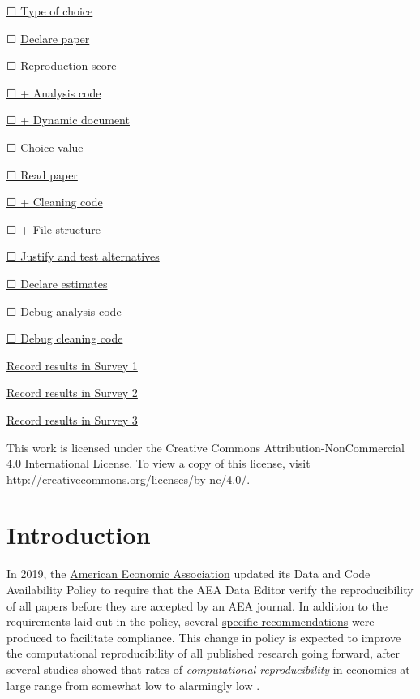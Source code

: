 \documentclass[]{book}
\begin{document}
\protect\hyperlink{id-type}{☐ Type of choice}

☐ \protect\hyperlink{declare}{Declare paper}

\protect\hyperlink{score}{☐ Reproduction score}

\protect\hyperlink{ac}{☐ + Analysis code}

\protect\hyperlink{paper-level}{☐ + Dynamic document}

\protect\hyperlink{id-val}{☐ Choice value}

\protect\hyperlink{read-summ}{☐ Read paper}

\protect\hyperlink{cc}{☐ + Cleaning code}

\protect\hyperlink{paper-level}{☐ + File structure}

\protect\hyperlink{test-rob}{☐ Justify and test alternatives}

\protect\hyperlink{declare-estimates}{☐ Declare estimates}

\protect\hyperlink{dac}{☐ Debug analysis code}

\protect\hyperlink{dcc}{☐ Debug cleaning code}

\href{https://berkeley.qualtrics.com/jfe/form/SV_2bO83uJvU9ZiTXv}{Record results in Survey 1}

\href{https://berkeley.qualtrics.com/jfe/form/SV_2gd9Y3XVtjLpZL7}{Record results in Survey 2}

\href{ADD\%20LINK}{Record results in Survey 3}

This work is licensed under the Creative Commons Attribution-NonCommercial 4.0 International License. To view a copy of this license, visit \url{http://creativecommons.org/licenses/by-nc/4.0/}.

\hypertarget{intro}{%
\chapter*{Introduction}\label{intro}}

In 2019, the \href{https://www.aeaweb.org/journals/policies/data-code/}{American Economic Association} updated its Data and Code Availability Policy to require that the AEA Data Editor verify the reproducibility of all papers before they are accepted by an AEA journal. In addition to the requirements laid out in the policy, several \href{https://aeadataeditor.github.io/aea-de-guidance/}{specific recommendations} were produced to facilitate compliance. This change in policy is expected to improve the computational reproducibility of all published research going forward, after several studies showed that rates of \emph{computational reproducibility} in economics at large range from somewhat low to alarmingly low \citep{galiani2018make, chang2015economics, kingi2018reproducibility}.
\end{document}
